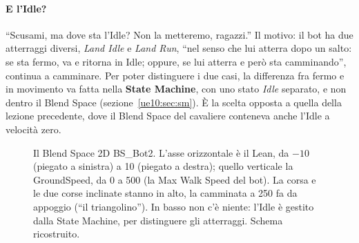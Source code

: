 \paragraph{E l'Idle?} ``Scusami, ma dove sta l'Idle? Non la metteremo, ragazzi.'' Il
motivo: il bot ha due atterraggi diversi, \emph{Land Idle} e \emph{Land Run}, ``nel senso
che lui atterra dopo un salto: se sta fermo, va e ritorna in Idle; oppure, se lui atterra
e però sta camminando'', continua a camminare. Per poter distinguere i due casi, la
differenza fra fermo e in movimento va fatta nella \textbf{State Machine}, con uno stato
\emph{Idle} separato, e non dentro il Blend Space (sezione~\ref{ue10:sec:sm}). È la scelta
opposta a quella della lezione precedente, dove il Blend Space del cavaliere conteneva anche
l'Idle a velocità zero.

\begin{figure}[htbp]
\centering
{}
\caption{Il Blend Space 2D BS\_Bot2. L'asse orizzontale è il Lean, da $-10$ (piegato a
sinistra) a 10 (piegato a destra); quello verticale la GroundSpeed, da 0 a 500 (la Max
Walk Speed del bot). La corsa e le due corse inclinate stanno in alto, la camminata a
250 fa da appoggio (``il triangolino''). In basso non c'è niente: l'Idle è gestito dalla
State Machine, per distinguere gli atterraggi. Schema ricostruito.}
\label{ue10:fig:blend}
\end{figure}

